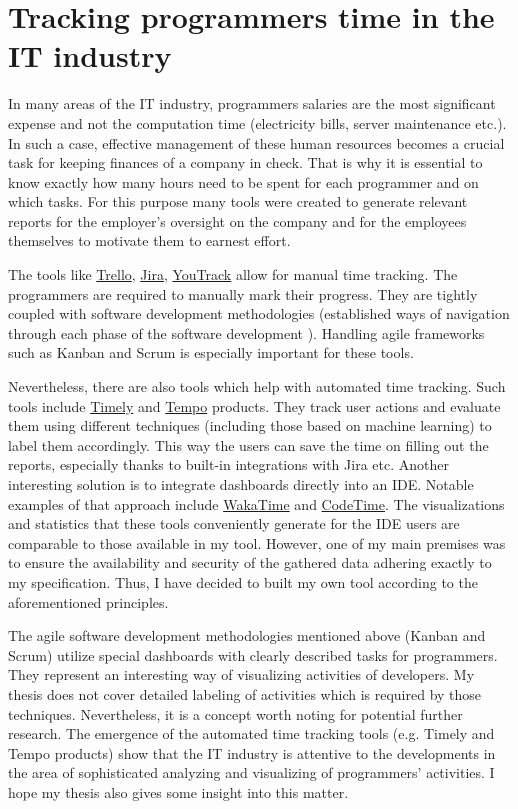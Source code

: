 \section{Tracking programmers time in the IT industry}

In many areas of the IT industry, programmers salaries are the most significant expense and not the computation time (electricity bills, server maintenance etc.). In such a case, effective management of these human resources becomes a crucial task for keeping finances of a company in check. That is why it is essential to know exactly how many hours need to be spent for each programmer and on which tasks. For this purpose many tools were created to generate relevant reports for the employer's oversight on the company and for the employees themselves to motivate them to earnest effort.

The tools like \href{https://trello.com/}{Trello}, \href{https://www.atlassian.com/software/jira}{Jira}, \href{https://www.jetbrains.com/youtrack/}{YouTrack} allow for manual time tracking. The programmers are required to manually mark their progress. They are tightly coupled with software development methodologies (established ways of navigation through each phase of the software development \cite{Con92SDM}). Handling agile frameworks such as Kanban and Scrum is especially important for these tools.

Nevertheless, there are also tools which help with automated time tracking. Such tools include \href{https://timelyapp.com/}{Timely} and \href{https://www.tempo.io/automated-time-tracking}{Tempo} products. They track user actions and evaluate them using different techniques (including those based on machine learning) to label them accordingly. This way the users can save the time on filling out the reports, especially thanks to built-in integrations with Jira etc. Another interesting solution is to integrate dashboards directly into an IDE. Notable examples of that approach include \href{https://wakatime.com/}{WakaTime} and \href{https://www.software.com/product/code-time}{CodeTime}. The visualizations and statistics that these tools conveniently generate for the IDE users are comparable to those available in my tool. However, one of my main premises was to ensure the availability and security of the gathered data adhering exactly to my specification. Thus, I have decided to built my own tool according to the aforementioned principles.

The agile software development methodologies mentioned above (Kanban and Scrum) utilize special dashboards with clearly described tasks for programmers. They represent an interesting way of visualizing activities of developers. My thesis does not cover detailed labeling of activities which is required by those techniques. Nevertheless, it is a concept worth noting for potential further research. The emergence of the automated time tracking tools (e.g. Timely and Tempo products) show that the IT industry is attentive to the developments in the area of sophisticated analyzing and visualizing of programmers' activities. I hope my thesis also gives some insight into this matter.
